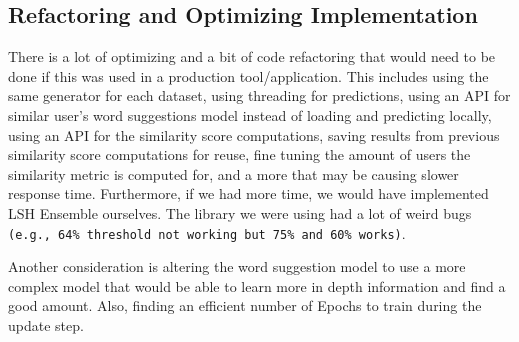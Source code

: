 \documentclass[sigconf]{acmart}
\begin{document}
\subsection{Refactoring and Optimizing Implementation}
There is a lot of optimizing and a bit of code refactoring that would need to be done if this was used in a production tool/application. This includes using the same generator for each dataset, using threading for predictions, using an API for similar user’s word suggestions model instead of loading and predicting locally, using an API for the similarity score computations, saving results from previous similarity score computations for reuse, fine tuning the amount of users the similarity metric is computed for, and a more that may be causing slower response time. Furthermore, if we had more time, we would have implemented LSH Ensemble ourselves. The library we were using had a lot of weird bugs \lstinline{(e.g., 64% threshold not working but 75% and 60% works)}. 

Another consideration is altering the word suggestion model to use a more complex model that would be able to learn more in depth information and find a good amount. Also, finding an efficient number of Epochs to train during the update step.




\pagestyle{plain} %
\end{document}
